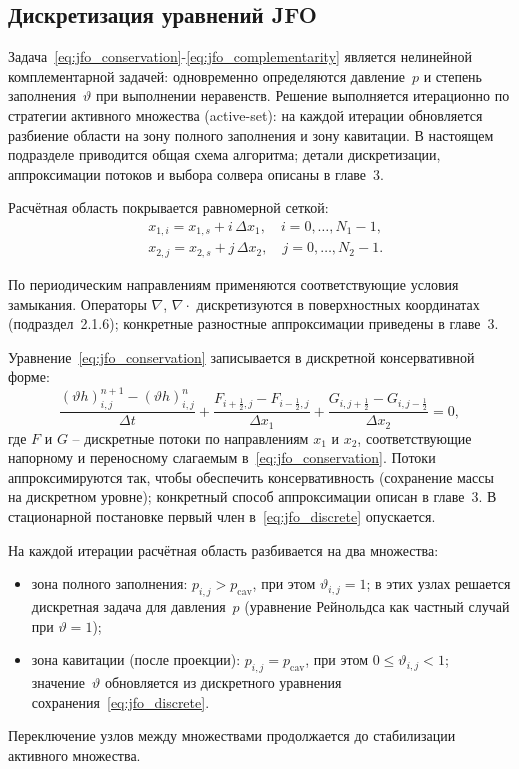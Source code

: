 \subsection{Дискретизация уравнений JFO}

Задача~\eqref{eq:jfo_conservation}-\eqref{eq:jfo_complementarity}
является нелинейной комплементарной задачей: одновременно определяются
давление~$p$ и степень заполнения~$\vartheta$ при выполнении
неравенств.  Решение выполняется итерационно по стратегии активного
множества (active-set): на каждой итерации обновляется разбиение
области на зону полного заполнения и зону кавитации.  В настоящем
подразделе приводится общая схема алгоритма; детали дискретизации,
аппроксимации потоков и выбора солвера описаны в главе~3.

Расчётная область покрывается равномерной сеткой:
\begin{equation}\label{eq:jfo_grid}
  \begin{aligned}
    &x_{1,i} = x_{1,s} + i\,\Delta x_1, \quad i = 0, \ldots, N_1 - 1, \\
    &x_{2,j} = x_{2,s} + j\,\Delta x_2, \quad j = 0, \ldots, N_2 - 1.
  \end{aligned}
\end{equation}

По периодическим направлениям применяются соответствующие условия
замыкания.  Операторы $\nabla$, $\nabla\!\cdot$ дискретизуются
в поверхностных координатах (подраздел~2.1.6); конкретные разностные
аппроксимации приведены в главе~3.

Уравнение~\eqref{eq:jfo_conservation} записывается в дискретной
консервативной форме:
\begin{equation}\label{eq:jfo_discrete}
  \frac{(\vartheta h)_{i,j}^{n+1} - (\vartheta h)_{i,j}^{n}}{\Delta t}
  + \frac{F_{i+\frac{1}{2},j} - F_{i-\frac{1}{2},j}}{\Delta x_1}
  + \frac{G_{i,j+\frac{1}{2}} - G_{i,j-\frac{1}{2}}}{\Delta x_2}
  = 0,
\end{equation}
где $F$ и $G$ -- дискретные потоки по направлениям $x_1$ и $x_2$,
соответствующие напорному и переносному слагаемым
в~\eqref{eq:jfo_conservation}.  Потоки аппроксимируются так, чтобы
обеспечить консервативность (сохранение массы на дискретном уровне);
конкретный способ аппроксимации описан в главе~3.  В стационарной
постановке первый член в~\eqref{eq:jfo_discrete} опускается.

На каждой итерации расчётная область разбивается на два множества:
\begin{itemize}
  \item зона полного заполнения: $p_{i,j} > p_{\mathrm{cav}}$,
    при этом $\vartheta_{i,j} = 1$; в этих узлах решается дискретная
    задача для давления~$p$ (уравнение Рейнольдса как частный случай
    при $\vartheta = 1$);
  \item зона кавитации (после проекции): $p_{i,j} = p_{\mathrm{cav}}$,
    при этом $0 \leq \vartheta_{i,j} < 1$; значение~$\vartheta$
    обновляется из дискретного уравнения
    сохранения~\eqref{eq:jfo_discrete}.
\end{itemize}
Переключение узлов между множествами продолжается до стабилизации
активного множества.

